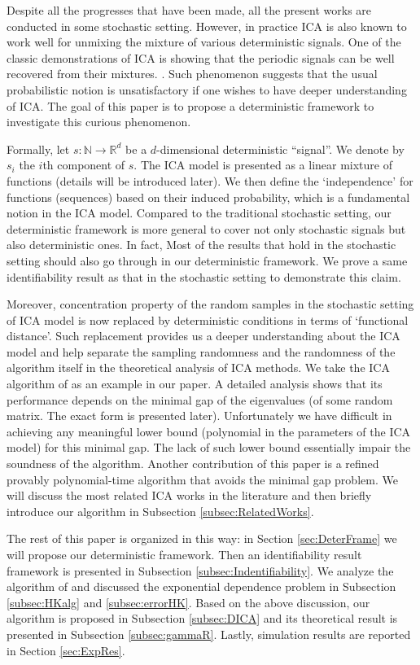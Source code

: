 \documentclass[twoside]{article}
\newcommand{\ra}{\rightarrow}
\newcommand{\real}{\mathbb{R}}
\renewcommand{\natural}{\mathbb{N}}
\theoremstyle{definition}
\begin{document}
Despite all the progresses that have been made, all the present works are conducted in some stochastic setting.
However, in practice ICA is also known to work well for unmixing the mixture of various deterministic signals. 
One of the classic demonstrations of ICA is showing that the periodic signals can be well recovered from their mixtures. \citep{HyvOja00}.
Such phenomenon suggests that the usual probabilistic notion is unsatisfactory if one wishes to have deeper understanding of ICA.   
The goal of this paper is to propose a deterministic framework to investigate this curious phenomenon. 

Formally, let $s:\natural \ra \real^d$ be a $d$-dimensional deterministic ``signal''. We denote by $s_i$ the $i$th component of $s$.
The ICA model is presented as a linear mixture of functions (details will be introduced later).
We then define the `independence' for functions (sequences) based on their induced probability, which is a fundamental notion in the ICA model.
Compared to the traditional stochastic setting, our deterministic framework is more general to cover not only stochastic signals but also deterministic ones. 
In fact, Most of the results that hold in the stochastic setting should also go through in our deterministic framework.
We prove a same identifiability result as that in the stochastic setting to demonstrate this claim.

Moreover, concentration property of the random samples in the stochastic setting of ICA model is now replaced by deterministic conditions in terms of `functional distance'.
Such replacement provides us a deeper understanding about the ICA model and help separate the sampling randomness and the randomness of the algorithm itself in the theoretical analysis of ICA methods.
We take the ICA algorithm of \citep{hsu2013learning} as an example in our paper.
A detailed analysis shows that its performance depends on the minimal gap of the eigenvalues (of some random matrix. The exact form is presented later).
Unfortunately we have difficult in achieving any meaningful lower bound (polynomial in the parameters of the ICA model) for this minimal gap.
The lack of such lower bound essentially impair the soundness of the algorithm. 
Another contribution of this paper is a refined provably polynomial-time algorithm that avoids the minimal gap problem. 
We will discuss the most related ICA works in the literature and then briefly introduce our algorithm in Subsection \ref{subsec:RelatedWorks}.

The rest of this paper is organized in this way: 
in Section \ref{sec:DeterFrame} we will propose our deterministic framework. 
Then an identifiability result framework is presented in Subsection \ref{subsec:Indentifiability}.
We analyze the algorithm of \cite{hsu2013learning} and discussed the exponential dependence problem in Subsection \ref{subsec:HKalg} and \ref{subsec:errorHK}. 
Based on the above discussion, our algorithm is proposed in Subsection \ref{subsec:DICA} and its theoretical result is presented in Subsection \ref{subsec:gammaR}.
Lastly, simulation results are reported in Section \ref{sec:ExpRes}.
\end{document}
